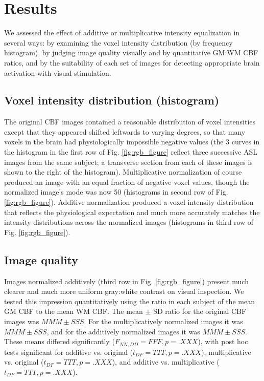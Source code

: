 \section{Results}
We assessed the effect of additive or multiplicative intensity equalization in several ways: by examining the voxel intensity distribution (by frequency histogram), by judging image quality visually and by quantitative GM:WM CBF ratios, and by the suitability of each set of images for detecting appropriate brain activation with visual stimulation.

\subsection{Voxel intensity distribution (histogram)}
The original CBF images contained a reasonable distribution of voxel intensities except that they appeared shifted leftwards to varying degrees, so that many voxels in the brain had physiologically impossible negative values (the 3 curves in the histogram in the first row of Fig. \ref{fig:rgb_figure} reflect three successive ASL images from the same subject; a transverse section from each of these images is shown to the right of the histogram). Multiplicative normalization of course produced an image with an equal fraction of negative voxel values, though the normalized image's mode was now 50 (histograms in second row of Fig. \ref{fig:rgb_figure}). Additive normalization produced a voxel intensity distribution that reflects the physiological expectation and much more accurately matches the intensity distributions across the normalized images (histograms in third row of Fig. \ref{fig:rgb_figure}). 

\subsection{Image quality}
Images normalized additively (third row in Fig. \ref{fig:rgb_figure}) present much clearer and much more uniform gray:white contrast on visual inspection. We tested this impression quantitatively using the ratio in each subject of the mean GM CBF to the mean WM CBF. The mean $\pm$ SD ratio for the original CBF images was $MMM \pm SSS$. For the multiplicatively normalized images it was $MMM \pm SSS$, and for the additively normalized images it was $MMM \pm SSS$. These means differed significantly ($F_{NN,DD} = FFF, p = .XXX$), with post hoc tests significant for additive vs. original ($t_{DF} = TTT, p = .XXX$), multiplicative vs. original ($t_{DF} = TTT, p = .XXX$), and additive vs. multiplicative ($t_{DF} = TTT, p = .XXX$).


